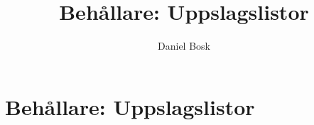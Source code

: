 \documentclass[a4paper,10pt,oneside,openright,
               oldfontcommands]{memoir}
\begin{document}
\title{%
  Behållare: Uppslagslistor
}
\author{Daniel Bosk}

\maketitle

\begin{abstract}
  
\end{abstract}

\clearpage

\tableofcontents*

\chapter{Behållare: Uppslagslistor}



\appendix


\printbibliography
\end{document}
